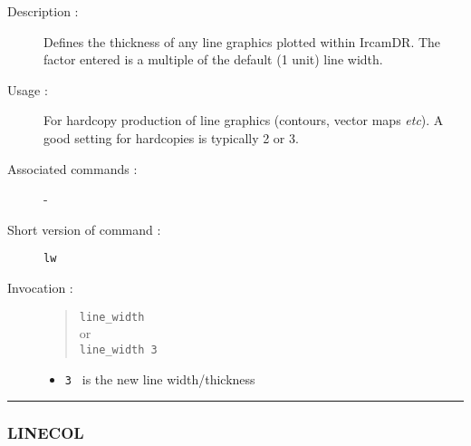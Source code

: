 \begin{description}

\item[Description :] Defines the thickness of any line graphics plotted
within {\sc IrcamDR}.  The factor entered is a multiple of the default
(1 unit) line width.

\item[Usage :] For hardcopy production of line graphics (contours,
vector maps \emph{etc}).  A good setting for hardcopies is typically 2
or 3.

\item[Associated commands :] -
\item[Short version of command :] {\tt lw}
\item[Invocation :]

\begin{quote}{\tt  line\_width }\\
or \\
{\tt line\_width 3 }
\end{quote}

\begin{itemize}

\item {\tt 3 } is the new line width/thickness

\end{itemize}

\end{description}

\hrule 
\subsubsection*{\label{LINECOL}LINECOL}

